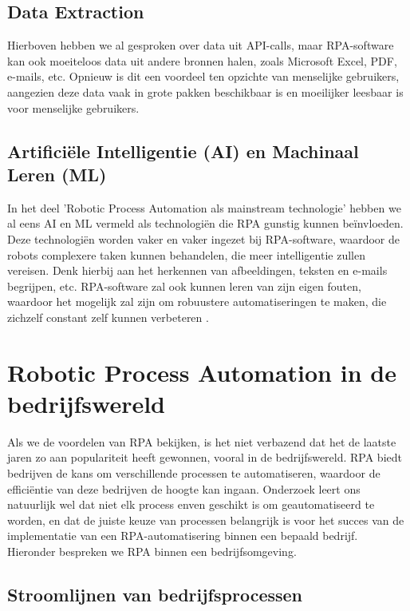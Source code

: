 \subsection{Data Extraction}

Hierboven hebben we al gesproken over data uit API-calls, maar RPA-software kan ook moeiteloos data uit andere bronnen halen, zoals Microsoft Excel, PDF, e-mails, etc. \autocite{Andrade2022} Opnieuw is dit een voordeel ten opzichte van menselijke gebruikers, aangezien deze data vaak in grote pakken beschikbaar is en moeilijker leesbaar is voor menselijke gebruikers.

\subsection{Artificiële Intelligentie (AI) en Machinaal Leren (ML)}

In het deel 'Robotic Process Automation als mainstream technologie' hebben we al eens AI en ML vermeld als technologiën die RPA gunstig kunnen beïnvloeden. Deze technologiën worden vaker en vaker ingezet bij RPA-software, waardoor de robots complexere taken kunnen behandelen, die meer intelligentie zullen vereisen. Denk hierbij aan het herkennen van afbeeldingen, teksten en e-mails begrijpen, etc. RPA-software zal ook kunnen leren van zijn eigen fouten, waardoor het mogelijk zal zijn om robuustere automatiseringen te maken, die zichzelf constant zelf kunnen verbeteren \autocite{Taulli2020}.

\section{Robotic Process Automation in de bedrijfswereld}

Als we de voordelen van RPA bekijken, is het niet verbazend dat het de laatste jaren zo aan populariteit heeft gewonnen, vooral in de bedrijfswereld. RPA biedt bedrijven de kans om verschillende processen te automatiseren, waardoor de efficiëntie van deze bedrijven de hoogte kan ingaan. Onderzoek leert ons natuurlijk wel dat niet elk process enven geschikt is om geautomatiseerd te worden, en dat de juiste keuze van processen belangrijk is voor het succes van de implementatie van een RPA-automatisering binnen een bepaald bedrijf. Hieronder bespreken we RPA binnen een bedrijfsomgeving.

\subsection{Stroomlijnen van bedrijfsprocessen}

